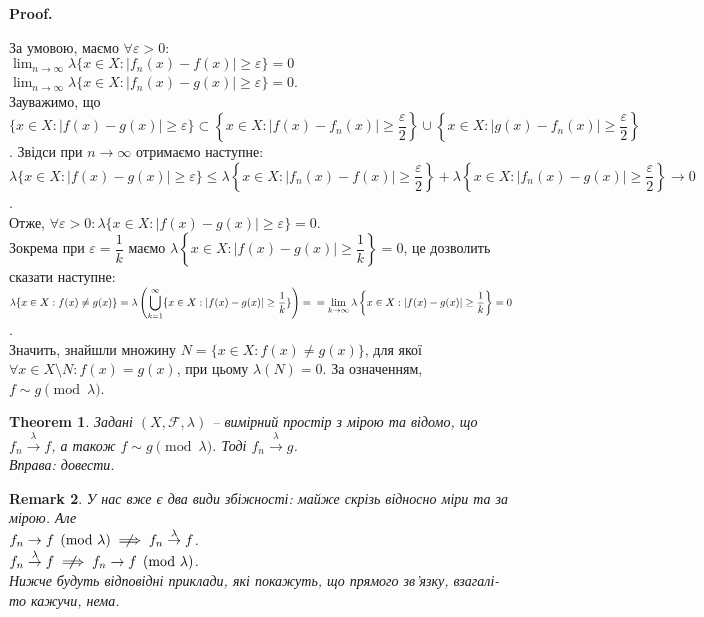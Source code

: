 \documentclass[a4paper, 10pt]{article}
\makeatletter
\theoremstyle{theoremdd}
\newtheorem{theorem}{Theorem}[subsection]
\newtheorem{remark}[theorem]{Remark}
\newcommand\tomeasure[1]{\overset{{#1}}{\to}}
\renewenvironment{proof}[1][Proof.\\]{\par
\pushQED{\hfill \qed}%
\normalfont \topsep6\p@\@plus6\p@\relax
\trivlist
\item\relax
{\bfseries
#1\@addpunct{.}}\hspace\labelsep\ignorespaces
}{%
\popQED\endtrivlist\@endpefalse
}
\makeatother
\begin{document}
\begin{proof}
За умовою, маємо $\forall \varepsilon > 0:$\\
$\displaystyle \lim_{n \to \infty} \lambda \{ x \in X: |f_n(x) - f(x)| \geq \varepsilon\} = 0$ \qquad $\displaystyle \lim_{n \to \infty} \lambda \{ x \in X: |f_n(x) - g(x)| \geq \varepsilon\} = 0$.\\
Зауважимо, що $\{ x \in X: |f(x)-g(x)| \geq \varepsilon \} \subset \left\{ x \in X: |f(x)-f_n(x)| \geq \dfrac{\varepsilon}{2} \right\} \cup \left\{ x \in X: |g(x)-f_n(x)| \geq \dfrac{\varepsilon}{2} \right\}$. Звідси при $n \to \infty$ отримаємо наступне:\\
$\lambda\{x \in X: |f(x)-g(x)| \geq \varepsilon\} \leq \lambda\left\{x \in X: |f_n(x)-f(x)| \geq \dfrac{\varepsilon}{2}\right\} + \lambda\left\{x \in X: |f_n(x)-g(x)| \geq \dfrac{\varepsilon}{2}\right\} \to 0$.\\
Отже, $\forall \varepsilon > 0: \lambda\{x \in X: |f(x)-g(x)| \geq \varepsilon\} = 0$.\\
Зокрема при $\varepsilon = \dfrac{1}{k}$ маємо $\lambda\left\{ x \in X: |f(x)-g(x)| \geq \dfrac{1}{k} \right\} = 0$, це дозволить сказати наступне:\\
$\lambda\{x \in X: f(x) \neq g(x)\} = \displaystyle\lambda\left(\bigcup_{k=1}^\infty \{x \in X: |f(x)-g(x)| \geq \dfrac{1}{k}\}\right) = \\ =\lim_{k \to \infty} \lambda\left\{x \in X: |f(x)-g(x)| \geq \dfrac{1}{k}\right\} = 0$.\\
Значить, знайшли множину $N = \{x \in X: f(x) \neq g(x)\}$, для якої $\forall x \in X \setminus N: f(x) = g(x)$, при цьому $\lambda(N) = 0$. За означенням, $f \sim g \pmod \lambda$.
\end{proof}

\begin{theorem}
Задані $(X,\mathcal{F},\lambda)$ -- вимірний простір з мірою та відомо, що $f_n \tomeasure{\lambda} f$, а також $f \sim g \pmod \lambda$. Тоді $f_n \tomeasure{\lambda} g$.\\
\textit{Вправа: довести.}
\end{theorem}

\begin{remark}
У нас вже є два види збіжності: майже скрізь відносно міри та за мірою. Але\\
$f_n \to f \pmod \lambda \centernot\implies f_n \tomeasure{\lambda} f$.\\
$f_n \tomeasure{\lambda} f \centernot\implies f_n \to f \pmod \lambda$.\\
Нижче будуть відповідні приклади, які покажуть, що прямого зв'язку, взагалі-то кажучи, нема.
\end{remark}
\end{document}
